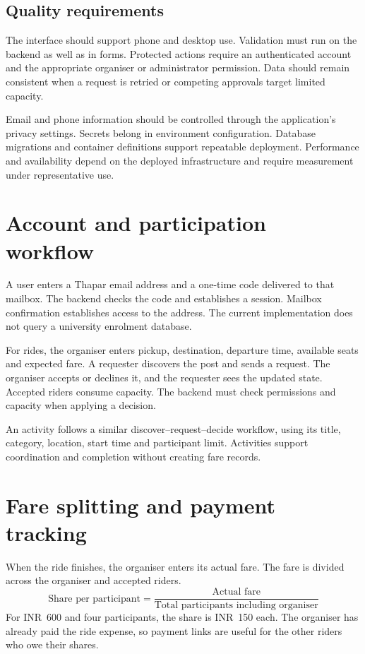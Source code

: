 \documentclass[11pt,a4paper]{article}
\begin{document}
\subsection{Quality requirements}
The interface should support phone and desktop use. Validation must run on the backend as well as in forms. Protected actions require an authenticated account and the appropriate organiser or administrator permission. Data should remain consistent when a request is retried or competing approvals target limited capacity.

Email and phone information should be controlled through the application's privacy settings. Secrets belong in environment configuration. Database migrations and container definitions support repeatable deployment. Performance and availability depend on the deployed infrastructure and require measurement under representative use.

\section{Account and participation workflow}
A user enters a Thapar email address and a one-time code delivered to that mailbox. The backend checks the code and establishes a session. Mailbox confirmation establishes access to the address. The current implementation does not query a university enrolment database.

For rides, the organiser enters pickup, destination, departure time, available seats and expected fare. A requester discovers the post and sends a request. The organiser accepts or declines it, and the requester sees the updated state. Accepted riders consume capacity. The backend must check permissions and capacity when applying a decision.

An activity follows a similar discover--request--decide workflow, using its title, category, location, start time and participant limit. Activities support coordination and completion without creating fare records.

\clearpage
\section{Fare splitting and payment tracking}
When the ride finishes, the organiser enters its actual fare. The fare is divided across the organiser and accepted riders.
\[
\text{Share per participant}=\frac{\text{Actual fare}}{\text{Total participants including organiser}}
\]
For INR~600 and four participants, the share is INR~150 each. The organiser has already paid the ride expense, so payment links are useful for the other riders who owe their shares.
\end{document}
